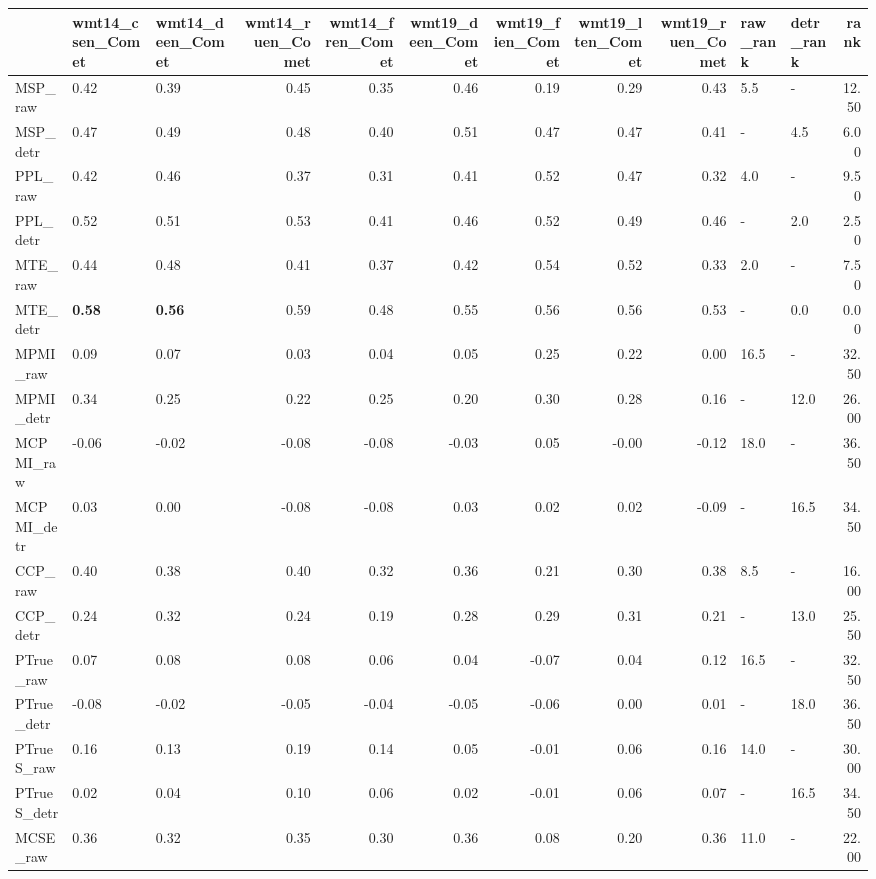 \begin{tabular}{lllrrrrrrllr}
\toprule
\midrule
 & wmt14\_csen\_Comet & wmt14\_deen\_Comet & wmt14\_ruen\_Comet & wmt14\_fren\_Comet & wmt19\_deen\_Comet & wmt19\_fien\_Comet & wmt19\_lten\_Comet & wmt19\_ruen\_Comet & raw\_rank & detr\_rank & rank \\
\midrule
\midrule
MSP\_raw & 0.42 & 0.39 & 0.45 & 0.35 & 0.46 & 0.19 & 0.29 & 0.43 & 5.5 & - & 12.50 \\
MSP\_detr & 0.47 & 0.49 & 0.48 & 0.40 & 0.51 & 0.47 & 0.47 & 0.41 & - & 4.5 & 6.00 \\
\midrule
PPL\_raw & 0.42 & 0.46 & 0.37 & 0.31 & 0.41 & 0.52 & 0.47 & 0.32 & 4.0 & - & 9.50 \\
PPL\_detr & 0.52 & 0.51 & 0.53 & 0.41 & 0.46 & 0.52 & 0.49 & 0.46 & - & 2.0 & 2.50 \\
\midrule
MTE\_raw & 0.44 & 0.48 & 0.41 & 0.37 & 0.42 & 0.54 & 0.52 & 0.33 & 2.0 & - & 7.50 \\
MTE\_detr & \textbf{0.58} & \textbf{0.56} & 0.59 & 0.48 & 0.55 & 0.56 & 0.56 & 0.53 & - & 0.0 & 0.00 \\
\midrule
MPMI\_raw & 0.09 & 0.07 & 0.03 & 0.04 & 0.05 & 0.25 & 0.22 & 0.00 & 16.5 & - & 32.50 \\
MPMI\_detr & 0.34 & 0.25 & 0.22 & 0.25 & 0.20 & 0.30 & 0.28 & 0.16 & - & 12.0 & 26.00 \\
\midrule
MCPMI\_raw & -0.06 & -0.02 & -0.08 & -0.08 & -0.03 & 0.05 & -0.00 & -0.12 & 18.0 & - & 36.50 \\
MCPMI\_detr & 0.03 & 0.00 & -0.08 & -0.08 & 0.03 & 0.02 & 0.02 & -0.09 & - & 16.5 & 34.50 \\
\midrule
CCP\_raw & 0.40 & 0.38 & 0.40 & 0.32 & 0.36 & 0.21 & 0.30 & 0.38 & 8.5 & - & 16.00 \\
CCP\_detr & 0.24 & 0.32 & 0.24 & 0.19 & 0.28 & 0.29 & 0.31 & 0.21 & - & 13.0 & 25.50 \\
\midrule
PTrue\_raw & 0.07 & 0.08 & 0.08 & 0.06 & 0.04 & -0.07 & 0.04 & 0.12 & 16.5 & - & 32.50 \\
PTrue\_detr & -0.08 & -0.02 & -0.05 & -0.04 & -0.05 & -0.06 & 0.00 & 0.01 & - & 18.0 & 36.50 \\
\midrule
PTrueS\_raw & 0.16 & 0.13 & 0.19 & 0.14 & 0.05 & -0.01 & 0.06 & 0.16 & 14.0 & - & 30.00 \\
PTrueS\_detr & 0.02 & 0.04 & 0.10 & 0.06 & 0.02 & -0.01 & 0.06 & 0.07 & - & 16.5 & 34.50 \\
\midrule
MCSE\_raw & 0.36 & 0.32 & 0.35 & 0.30 & 0.36 & 0.08 & 0.20 & 0.36 & 11.0 & - & 22.00 \\

\end{tabular}
